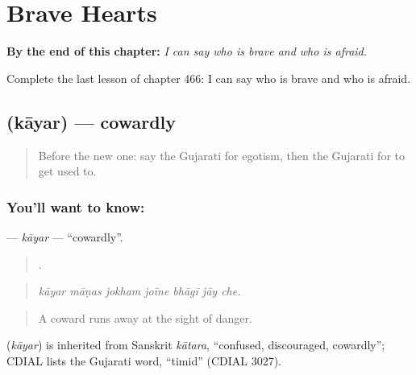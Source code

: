 
\chapter{Brave Hearts}
\label{ch:gu-brave-hearts}

\begin{chapteropening}
\textbf{By the end of this chapter:} \emph{I can say who is brave and who is afraid.}

Complete the last lesson of chapter 466: I can say who is brave and who is afraid.
\end{chapteropening}

\section[\texorpdfstring{\gu{કાયર} (kāyar)}{કાયર (kāyar)}]{ (kāyar) — cowardly}

\label{lesson:GU-C466-kayar}



\begin{quote}
Before the new one: say the Gujarati for egotism, then the Gujarati for to get used to.
\end{quote}

\subsection*{You'll want to know: }
\textbf{} — \emph{kāyar} — \textquotedblleft{}cowardly\textquotedblright{}.

\begin{quote}
      .
\end{quote}

\begin{quote}
\emph{kāyar māṇas jokham joīne bhāgī jāy che.}
\end{quote}

\begin{quote}
A coward runs away at the sight of danger.
\end{quote}

\begin{cousinweb}
\textbf{} (\emph{kāyar}) is inherited from Sanskrit \emph{kātara}, \textquotedblleft{}confused, discouraged, cowardly\textquotedblright{}; CDIAL lists the Gujarati word, \textquotedblleft{}timid\textquotedblright{} (CDIAL 3027).
\end{cousinweb}

